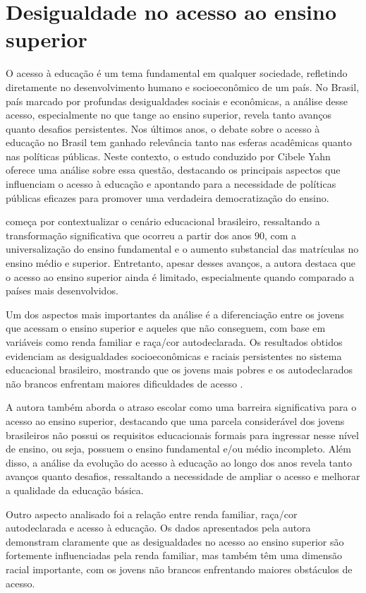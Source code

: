 \section{Desigualdade no acesso ao ensino superior}

O acesso à educação é um tema fundamental em qualquer sociedade, refletindo diretamente no desenvolvimento humano e socioeconômico de um país. No Brasil, país marcado por profundas desigualdades sociais e econômicas, a análise desse acesso, especialmente no que tange ao ensino superior, revela tanto avanços quanto desafios persistentes. Nos últimos anos, o debate sobre o acesso à educação no Brasil tem ganhado relevância tanto nas esferas acadêmicas quanto nas políticas públicas. Neste contexto, o estudo conduzido por Cibele Yahn oferece uma análise sobre essa questão, destacando os principais aspectos que influenciam o acesso à educação e apontando para a necessidade de políticas públicas eficazes para promover uma verdadeira democratização do ensino.

 \cite{de2012acesso} começa por contextualizar o cenário educacional brasileiro, ressaltando a transformação significativa que ocorreu a partir dos anos 90, com a universalização do ensino fundamental e o aumento substancial das matrículas no ensino médio e superior. Entretanto, apesar desses avanços, a autora destaca que o acesso ao ensino superior ainda é limitado, especialmente quando comparado a países mais desenvolvidos.

Um dos aspectos mais importantes da análise é a diferenciação entre os jovens que acessam o ensino superior e aqueles que não conseguem, com base em variáveis como renda familiar e raça/cor autodeclarada. Os resultados obtidos evidenciam as desigualdades socioeconômicas e raciais persistentes no sistema educacional brasileiro, mostrando que os jovens mais pobres e os autodeclarados não brancos enfrentam maiores dificuldades de acesso  \cite{de2012acesso}.

A autora também aborda o atraso escolar como uma barreira significativa para o acesso ao ensino superior, destacando que uma parcela considerável dos jovens brasileiros não possui os requisitos educacionais formais para ingressar nesse nível de ensino, ou seja, possuem o ensino fundamental e/ou médio incompleto. Além disso, a análise da evolução do acesso à educação ao longo dos anos revela tanto avanços quanto desafios, ressaltando a necessidade de ampliar o acesso e melhorar a qualidade da educação básica.

Outro aspecto analisado foi a relação entre renda familiar, raça/cor autodeclarada e acesso à educação. Os dados apresentados pela autora demonstram claramente que as desigualdades no acesso ao ensino superior são fortemente influenciadas pela renda familiar, mas também têm uma dimensão racial importante, com os jovens não brancos enfrentando maiores obstáculos de acesso.

